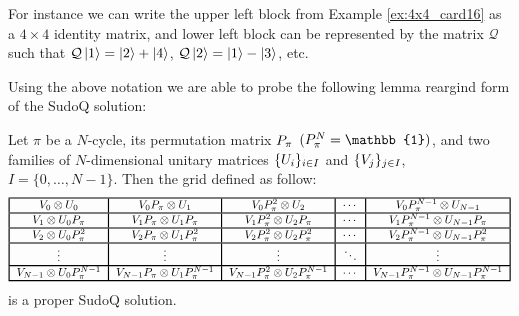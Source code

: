 \documentclass[11pt]{article}
\begin{document}
For instance we can write the upper left block from Example \ref{ex:4x4_card16} as a $4\times 4$ identity matrix, and lower left block can be represented by the matrix $\mathcal{Q}$ such that $\mathcal{Q}\ket{1}=\ket{2}+\ket{4}$, $\mathcal{Q}\ket{2}=\ket{1}-\ket{3}$, etc.

Using the above notation we are able to probe the following lemma reargind form of the SudoQ solution:
 \begin{lemma}\label{biglemma}
    Let $\pi$ be a $N$-cycle, its permutation matrix $\mathnormal{P}_\pi$ $(\mathnormal{P}_\pi^N=\mathbb{1})$, and two families of $N$-dimensional unitary matrices $\{\mathnormal{U}_i\}_{i\in I}$ and $\{\mathnormal{V}_j\}_{j\in I}$, $I=\{0,\ldots,N-1\}$. Then the grid defined as follow:
    \[
    \begin{tabular}{!{\vrule width 1pt}c!{\vrule width 1pt}c!{\vrule width 1pt}c!{\vrule width 1pt}c!{\vrule width 1pt}c!{\vrule width 1pt}}
    \noalign{\hrule height 1pt}
    $\mathnormal{V}_0\otimes\mathnormal{U}_0$ & $\mathnormal{V}_0\mathnormal{P}_\pi\otimes\mathnormal{U}_1$ & $\mathnormal{V}_0\mathnormal{P}_\pi^2\otimes\mathnormal{U}_2$ & $\cdots$ & $\mathnormal{V}_0\mathnormal{P}_\pi^{N-1}\otimes\mathnormal{U}_{N-1}$ \tabularnewline
    \noalign{\hrule height 1pt}
    $\mathnormal{V}_1\otimes\mathnormal{U}_0\mathnormal{P}_\pi$ & $\mathnormal{V}_1\mathnormal{P}_\pi\otimes\mathnormal{U}_1\mathnormal{P}_\pi$ & $\mathnormal{V}_1\mathnormal{P}_\pi^2\otimes\mathnormal{U}_2\mathnormal{P}_\pi$ & $\cdots$ & $\mathnormal{V}_1\mathnormal{P}_\pi^{N-1}\otimes\mathnormal{U}_{N-1}\mathnormal{P}_\pi$ \tabularnewline
    \noalign{\hrule height 1pt}
    $\mathnormal{V}_2\otimes\mathnormal{U}_0\mathnormal{P}_\pi^2$ & $\mathnormal{V}_2\mathnormal{P}_\pi\otimes\mathnormal{U}_1\mathnormal{P}_\pi^2$ & $\mathnormal{V}_2\mathnormal{P}_\pi^2\otimes\mathnormal{U}_2\mathnormal{P}_\pi^2$ & $\cdots$ & $\mathnormal{V}_2\mathnormal{P}_\pi^{N-1}\otimes\mathnormal{U}_{N-1}\mathnormal{P}_\pi^2$ \tabularnewline
    \noalign{\hrule height 1pt}
    $\vdots$ & $\vdots$ & $\vdots$ & $\ddots$ & $\vdots$ \tabularnewline
    \noalign{\hrule height 1pt}
    $\mathnormal{V}_{N-1}\otimes\mathnormal{U}_0\mathnormal{P}_\pi^{N-1}$ & $\mathnormal{V}_{N-1}\mathnormal{P}_\pi\otimes\mathnormal{U}_1\mathnormal{P}_\pi^{N-1}$ & $\mathnormal{V}_{N-1}\mathnormal{P}_\pi^2\otimes\mathnormal{U}_2\mathnormal{P}_\pi^{N-1}$ & $\cdots$ & $\mathnormal{V}_{N-1}\mathnormal{P}_\pi^{N-1}\otimes\mathnormal{U}_{N-1}\mathnormal{P}_\pi^{N-1}$ \tabularnewline
    \noalign{\hrule height 1pt}
    \end{tabular}
    \]
    is a proper SudoQ solution.
    \end{lemma}
    
\end{document}
